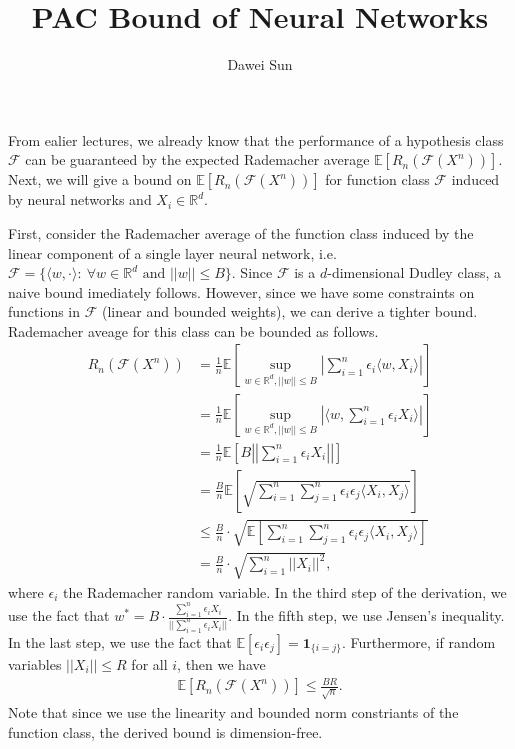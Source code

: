 \documentclass[12pt]{llncs}
\title{PAC Bound of Neural Networks}
\author{Dawei Sun}
\institute{\email{daweis2@illinois.edu}\\ University of Illinois at Urbana Champaign}
\newcommand{\E}[1]{\mathbb{E}\left[#1\right]}
\newcommand{\F}{\mathcal{F}}
\newcommand{\reals}{\mathbb{R}}
\begin{document}
\maketitle
From ealier lectures, we already know that the performance of a hypothesis class $\F$ can be guaranteed by the expected Rademacher average $\E{R_n(\F(X^n))}$. Next, we will give a bound on $\E{R_n(\F(X^n))}$ for function class $\F$ induced by neural networks and $X_i \in \reals^d$.

First, consider the Rademacher average of the function class induced by the linear component of a single layer neural network, i.e. $\F = \{\langle w, \cdot \rangle :\ \forall w \in \reals^d\text{ and }||w|| \leq B\}$. Since $\F$ is a $d$-dimensional Dudley class, a naive bound imediately follows. However, since we have some constraints on functions in $\F$ (linear and bounded weights), we can derive a tighter bound. Rademacher aveage for this class can be bounded as follows.
\begin{align*}
  R_n(\F(X^n)) &= \frac{1}{n}\E{\sup\limits_{w \in \reals^d, ||w|| \leq B} \left| \sum_{i=1}^{n} \epsilon_i \langle w, X_i \rangle \right|}\\ &= \frac{1}{n}\E{\sup\limits_{w \in \reals^d, ||w|| \leq B} \left| \langle w, \sum_{i=1}^{n} \epsilon_i X_i \rangle \right|}\\ &= \frac{1}{n}\E{B \left|\left| \sum_{i=1}^{n} \epsilon_i X_i \right|\right|}\\ &= \frac{B}{n}\E{\sqrt{\sum_{i=1}^{n}\sum_{j=1}^{n} \epsilon_i \epsilon_j \langle X_i, X_j \rangle}}\\ &\leq \frac{B}{n} \cdot \sqrt{\E{\sum_{i=1}^{n}\sum_{j=1}^{n} \epsilon_i \epsilon_j \langle X_i, X_j \rangle}}\\ &= \frac{B}{n} \cdot \sqrt{\sum_{i=1}^{n} \left|\left| X_i \right|\right|^2},
\end{align*}
where $\epsilon_i$ the Rademacher random variable. In the third step of the derivation, we use the fact that $w^* = B \cdot \frac{\sum_{i=1}^{n} \epsilon_i X_i}{||\sum_{i=1}^{n} \epsilon_i X_i||}$. In the fifth step, we use Jensen's inequality. In the last step, we use the fact that $\E{\epsilon_i \epsilon_j} = \bm 1_{\{i=j\}}$. Furthermore, if random variables $||X_i|| \leq R$ for all $i$, then we have
\begin{align}
  \E{R_n(\F(X^n))} \leq \frac{BR}{\sqrt{n}}.
\end{align}
Note that since we use the linearity and bounded norm constriants of the function class, the derived bound is dimension-free.
\end{document}
